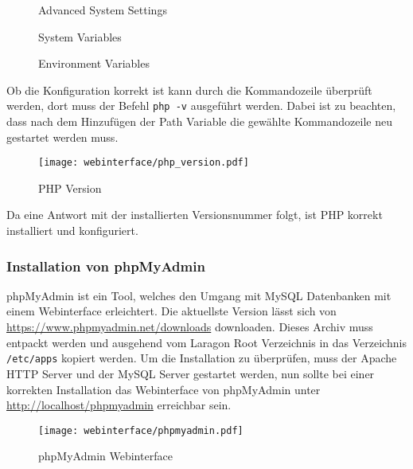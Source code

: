 \begin{figure}[H]
  \centering
  \caption{Advanced System Settings}
\end{figure}

\begin{figure}[H]
  \centering
  \caption{System Variables}
\end{figure}

\begin{figure}[H]
  \centering
  \caption{Environment Variables}
\end{figure}

Ob die Konfiguration korrekt ist kann durch die Kommandozeile überprüft werden, dort
muss der Befehl \verb|php -v| ausgeführt werden. Dabei ist zu beachten, dass
nach dem Hinzufügen der Path Variable die gewählte Kommandozeile neu gestartet
werden muss.

\begin{figure}[H]
  \centering
  \texttt{[image: webinterface/php\_version.pdf]}
  \caption{PHP Version}
\end{figure}

Da eine Antwort mit der installierten Versionsnummer folgt, ist PHP korrekt
installiert und konfiguriert.

\subsubsection{Installation von phpMyAdmin}
phpMyAdmin ist ein Tool, welches den Umgang mit MySQL Datenbanken mit einem
Webinterface erleichtert. Die aktuellste Version lässt sich von
\url{https://www.phpmyadmin.net/downloads} downloaden. Dieses Archiv muss
entpackt werden und ausgehend vom Laragon Root Verzeichnis in das Verzeichnis
\verb|/etc/apps| kopiert werden. Um die Installation zu überprüfen, muss der
Apache HTTP Server und der MySQL Server gestartet werden, nun sollte bei einer
korrekten Installation das Webinterface von phpMyAdmin unter
\url{http://localhost/phpmyadmin} erreichbar sein.

\begin{figure}[H]
  \centering
  \texttt{[image: webinterface/phpmyadmin.pdf]}
  \caption{phpMyAdmin Webinterface}
\end{figure}

